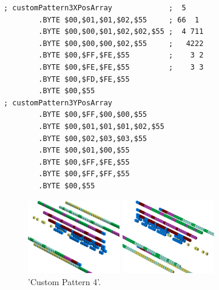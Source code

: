 \begin{minipage}[b]{0.46\linewidth}
\begin{lrbox}{\mybox}%
\begin{lstlisting}[basicstyle=\ttfamily\tiny]
; customPattern3XPosArray             ;  5    
        .BYTE $00,$01,$01,$02,$55     ; 66  1 
        .BYTE $00,$00,$01,$02,$02,$55 ;  4 711
        .BYTE $00,$00,$00,$02,$55     ;   4222
        .BYTE $00,$FF,$FE,$55         ;    3 2
        .BYTE $00,$FE,$FE,$55         ;    3 3
        .BYTE $00,$FD,$FE,$55
        .BYTE $00,$55
; customPattern3YPosArray
        .BYTE $00,$FF,$00,$00,$55
        .BYTE $00,$01,$01,$01,$02,$55
        .BYTE $00,$02,$03,$03,$55
        .BYTE $00,$01,$00,$55
        .BYTE $00,$FF,$FE,$55
        .BYTE $00,$FF,$FF,$55
        .BYTE $00,$55
\end{lstlisting}
\end{lrbox}%
\scalebox{0.8}{\usebox{\mybox}}

\end{minipage}
\begin{minipage}[b]{0.54\linewidth}
\begin{figure}[H]
    \centering
    \begin{adjustbox}{width=6cm,margin=0cm 0cm}
      \includegraphics[width=4cm]{src/patterns/pattern12-45.png}%
    \end{adjustbox}
    \begin{adjustbox}{width=6cm,margin=0cm -1.8cm}
      \includegraphics[width=4cm]{src/patterns/pattern12-225.png}%
    \end{adjustbox}
\caption{'Custom Pattern 4'.}
\end{figure}
\end{minipage}
